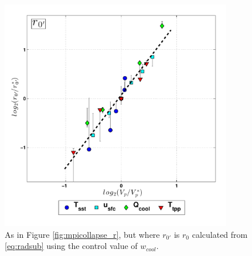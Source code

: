 \documentclass[12pt]{article}
\begin{document}
\begin{figure}[h!]
\centering
  \noindent\includegraphics[width=10cm,height=10cm]{FIGURES_TC_RCE_equilibrium_v2.0/Fig5_MPI_collapse_r0ctrlwcool.pdf}
\caption{As in Figure \ref{fig:mpicollapse_r}, but where $r_{0'}$ is $r_0$ calculated from \eqref{eq:radsub} using the control value of $w_{cool}$.}
\label{fig:mpicollapse_r0ctrlwcool}
\end{figure}
\end{document}
